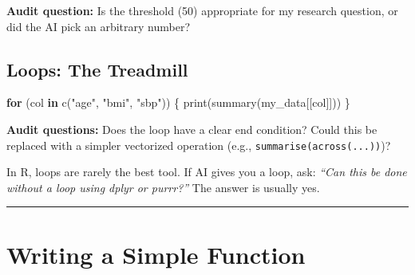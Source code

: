 \documentclass[
  letterpaper,
  DIV=11,
  numbers=noendperiod,
  oneside]{scrreprt}
\newenvironment{Shaded}{\begin{snugshade}}{\end{snugshade}}
\newcommand{\ControlFlowTok}[1]{\textcolor[rgb]{0.00,0.23,0.31}{\textbf{#1}}}
\newcommand{\FunctionTok}[1]{\textcolor[rgb]{0.28,0.35,0.67}{#1}}
\newcommand{\NormalTok}[1]{\textcolor[rgb]{0.00,0.23,0.31}{#1}}
\newcommand{\StringTok}[1]{\textcolor[rgb]{0.13,0.47,0.30}{#1}}
\begin{document}
\textbf{Audit question:} Is the threshold (50) appropriate for my
research question, or did the AI pick an arbitrary number?

\subsection*{Loops: The Treadmill}\label{loops-the-treadmill}

\begin{Shaded}
\begin{Highlighting}[numbers=left,,]
\ControlFlowTok{for}\NormalTok{ (col }\ControlFlowTok{in} \FunctionTok{c}\NormalTok{(}\StringTok{"age"}\NormalTok{, }\StringTok{"bmi"}\NormalTok{, }\StringTok{"sbp"}\NormalTok{)) \{}
  \FunctionTok{print}\NormalTok{(}\FunctionTok{summary}\NormalTok{(my\_data[[col]]))}
\NormalTok{\}}
\end{Highlighting}
\end{Shaded}

\textbf{Audit questions:} Does the loop have a clear end condition?
Could this be replaced with a simpler vectorized operation (e.g.,
\texttt{summarise(across(...))})?

\begin{tcolorbox}[enhanced jigsaw, title=\textcolor{quarto-callout-note-color}{\faInfo}\hspace{0.5em}{Note}, arc=.35mm, toptitle=1mm, colframe=quarto-callout-note-color-frame, toprule=.15mm, leftrule=.75mm, bottomtitle=1mm, opacityback=0, bottomrule=.15mm, coltitle=black, breakable, opacitybacktitle=0.6, titlerule=0mm, colback=white, left=2mm, colbacktitle=quarto-callout-note-color!10!white, rightrule=.15mm]

In R, loops are rarely the best tool. If AI gives you a loop, ask:
\emph{``Can this be done without a loop using dplyr or purrr?''} The
answer is usually yes.

\end{tcolorbox}

\begin{center}\rule{0.5\linewidth}{0.5pt}\end{center}

\section*{\texorpdfstring{Writing a Simple Function
}{Writing a Simple Function }}\label{writing-a-simple-function}
\end{document}
